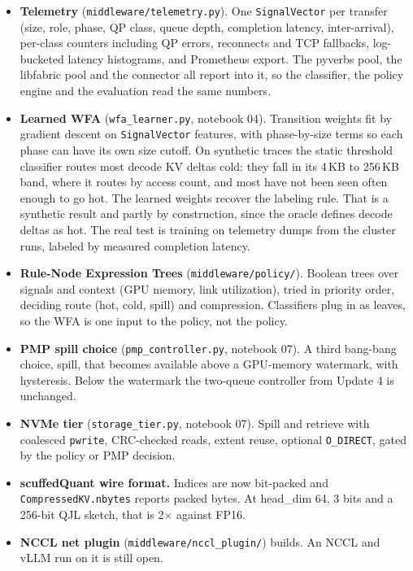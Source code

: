 \documentclass[11pt,letterpaper]{article}
\begin{document}
\begin{itemize}
\item \textbf{Telemetry} (\texttt{middleware/telemetry.py}). One \texttt{SignalVector} per transfer (size, role, phase, QP class, queue depth, completion latency, inter-arrival), per-class counters including QP errors, reconnects and TCP fallbacks, log-bucketed latency histograms, and Prometheus export. The pyverbs pool, the libfabric pool and the connector all report into it, so the classifier, the policy engine and the evaluation read the same numbers.
\item \textbf{Learned WFA} (\texttt{wfa\_learner.py}, notebook 04). Transition weights fit by gradient descent on \texttt{SignalVector} features, with phase-by-size terms so each phase can have its own size cutoff. On synthetic traces the static threshold classifier routes most decode KV deltas cold: they fall in its 4\,KB to 256\,KB band, where it routes by access count, and most have not been seen often enough to go hot. The learned weights recover the labeling rule. That is a synthetic result and partly by construction, since the oracle defines decode deltas as hot. The real test is training on telemetry dumps from the cluster runs, labeled by measured completion latency.
\item \textbf{Rule-Node Expression Trees} (\texttt{middleware/policy/}). Boolean trees over signals and context (GPU memory, link utilization), tried in priority order, deciding route (hot, cold, spill) and compression. Classifiers plug in as leaves, so the WFA is one input to the policy, not the policy.
\item \textbf{PMP spill choice} (\texttt{pmp\_controller.py}, notebook 07). A third bang-bang choice, spill, that becomes available above a GPU-memory watermark, with hysteresis. Below the watermark the two-queue controller from Update 4 is unchanged.
\item \textbf{NVMe tier} (\texttt{storage\_tier.py}, notebook 07). Spill and retrieve with coalesced \texttt{pwrite}, CRC-checked reads, extent reuse, optional \texttt{O\_DIRECT}, gated by the policy or PMP decision.
\item \textbf{scuffedQuant wire format.} Indices are now bit-packed and \texttt{CompressedKV.nbytes} reports packed bytes. At head\_dim 64, 3 bits and a 256-bit QJL sketch, that is 2$\times$ against FP16.
\item \textbf{NCCL net plugin} (\texttt{middleware/nccl\_plugin/}) builds. An NCCL and vLLM run on it is still open.
\end{itemize}
\end{document}
